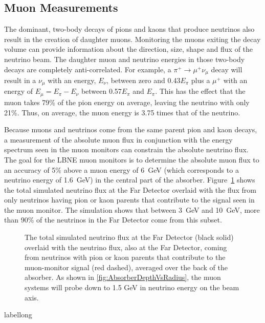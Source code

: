 \subsection{Muon Measurements}
\label{v3ch3-muon-meas}
The dominant, two-body decays of pions and kaons that produce
neutrinos also result in the creation of daughter muons. Monitoring
the muons exiting the decay volume can provide information about the
direction, size, shape and flux of the neutrino beam.  The daughter
muon and neutrino energies in those two-body decays are completely
anti-correlated. For example, a $\pi^+\rightarrow \mu^+\nu_\mu$
decay will result in a $\nu_\mu$ with an energy, $E_\nu$, between
zero and 0.43$E_\pi$ plus a $\mu^+$ with an energy of 
$E_\mu=E_\pi-E_\nu$ between 0.57$E_\pi$ and $E_\pi$. This has the
effect that the muon takes 79\% of the pion energy on average,  
leaving the neutrino with only  21\%. Thus, on average, the
muon energy is 3.75 times that of the neutrino.

Because muons and neutrinos come from the same parent pion and kaon
decays, a measurement of the absolute muon flux in conjunction with the energy spectrum
seen in the muon monitors can constrain the absolute neutrino flux.  The
goal for the LBNE muon monitors is to determine the absolute muon flux
to an accuracy of 5\% above a muon energy of 6~GeV (which corresponds to
a neutrino energy of 1.6~GeV) in the central part of the absorber.
Figure~\ref{fig:nu_mumon_frac} shows the total simulated neutrino flux at the Far Detector overlaid with the flux from only neutrinos having pion or kaon parents that contribute to the signal
seen in the muon monitor.  The simulation shows that between 3~GeV and 10~GeV, more than 90\% of 
the neutrinos in the Far Detector come from this subset.

\begin{figure}[htbp]
\begin{center}
\caption[Simulated neutrino fluxes at Far Detector]{The total simulated neutrino flux at the Far Detector (black solid) overlaid with the neutrino flux, also at the Far Detector, coming from
neutrinos with pion or kaon parents that contribute to the muon-monitor signal (red dashed), averaged over the back of the absorber. As shown in \ref{fig:AbsorberDepthVsRadius}, the muon systems will probe down to 1.5 GeV in neutrino energy on the beam axis.}
\label{fig:nu_mumon_frac}
\end{center}
\end{figure}
\begin{cdrfigure}[short]{label}{long}
\end{cdrfigure}

